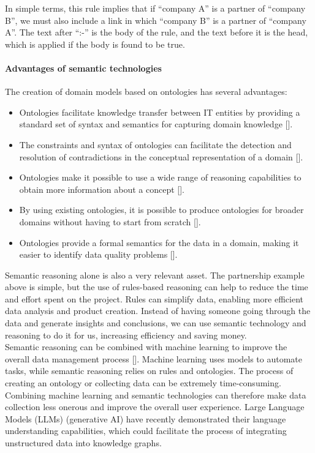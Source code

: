             In simple terms, this rule implies that if “company A” is a partner of “company B”, we must also include a link in which “company B” is a partner of “company A”. The text after “:-” is the body of the rule, and the text before it is the head, which is applied if the body is found to be true.


            \paragraph{Advantages of semantic technologies}
            The creation of domain models based on ontologies has several advantages: 
        
            \begin{itemize}
                \item Ontologies facilitate knowledge transfer between IT entities by providing a standard set of syntax and semantics for capturing domain knowledge []. 
                \item The constraints and syntax of ontologies can facilitate the detection and resolution of contradictions in the conceptual representation of a domain []. 
                \item Ontologies make it possible to use a wide range of reasoning capabilities to obtain more information about a concept []. 
                \item By using existing ontologies, it is possible to produce ontologies for broader domains without having to start from scratch []. 
                \item Ontologies provide a formal semantics for the data in a domain, making it easier to identify data quality problems [].
            \end{itemize}
        
            Semantic reasoning alone is also a very relevant asset. The partnership example above is simple, but the use of rules-based reasoning can help to reduce the time and effort spent on the project. Rules can simplify data, enabling more efficient data analysis and product creation. Instead of having someone going through the data and generate insights and conclusions, we can use semantic technology and reasoning to do it for us, increasing efficiency and saving money.\\
        
            Semantic reasoning can be combined with machine learning to improve the overall data management process []. Machine learning uses models to automate tasks, while semantic reasoning relies on rules and ontologies. The process of creating an ontology or collecting data can be extremely time-consuming. Combining machine learning and semantic technologies can therefore make data collection less onerous and improve the overall user experience. Large Language Models (LLMs) (generative AI) have recently demonstrated their language understanding capabilities, which could facilitate the process of integrating unstructured data into knowledge graphs.\\
        

